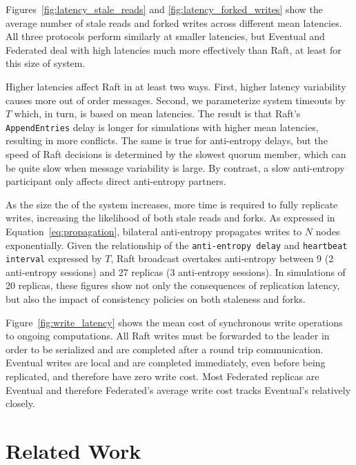 \documentclass[10pt,conference,letterpaper]{IEEEtran}
\begin{document}
Figures~\ref{fig:latency_stale_reads} and \ref{fig:latency_forked_writes} show
the average number of stale reads and forked writes across different mean
latencies.
All three protocols perform similarly at smaller latencies, but Eventual and
Federated deal with high latencies much more effectively than Raft, at least
for this size of system.

Higher latencies affect Raft in at least two ways.
First, higher latency variability causes more out of order messages.
Second, we parameterize system timeouts by $T$ which, in turn, is based on
mean latencies.
The result is that Raft's \texttt{AppendEntries} delay is longer for
simulations with higher mean latencies, resulting in more conflicts.
The same is true for anti-entropy delays, but the speed of Raft decisions is
determined by the slowest quorum member, which can be quite slow when message
variability is large.
By contrast, a slow anti-entropy participant only affects direct anti-entropy
partners.

As the size the of the system increases, more time is required to fully replicate writes,
increasing the likelihood of both stale reads and forks.
As expressed in Equation~\ref{eq:propagation}, bilateral anti-entropy propagates writes
to $N$ nodes exponentially.
Given the relationship of the \texttt{anti-entropy delay} and \texttt{heartbeat interval}
expressed by $T$, Raft broadcast overtakes anti-entropy between 9 (2 anti-entropy
sessions) and 27 replicas (3 anti-entropy sessions).
In simulations of 20 replicas, these figures show not only the consequences of
replication latency, but also the impact of consistency policies on both staleness and
forks.

Figure~\ref{fig:write_latency} shows the mean cost of synchronous write operations to
ongoing computations.
All Raft writes must be forwarded to the leader in order to be serialized and are
completed after a round trip communication.
Eventual writes are local and are completed immediately, even before being replicated,
and therefore have zero write cost.
Most Federated replicas are Eventual and therefore Federated's average write cost tracks
Eventual's relatively closely.

\section{Related Work}
\end{document}
